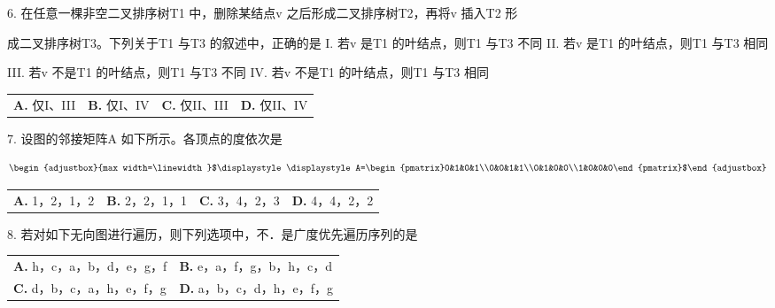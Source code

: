 \documentclass[UTF8,11pt]{ctexart}
\newcommand{\fitmath}[1]{\begin{adjustbox}{max width=\linewidth}$\displaystyle #1$\end{adjustbox}}
\begin{document}
6. 在任意一棵非空二叉排序树T1 中，删除某结点v 之后形成二叉排序树T2，再将v 插入T2 形


成二叉排序树T3。下列关于T1 与T3 的叙述中，正确的是 I. 若v 是T1 的叶结点，则T1 与T3 不同 II. 若v 是T1 的叶结点，则T1 与T3 相同


III. 若v 不是T1 的叶结点，则T1 与T3 不同 IV. 若v 不是T1 的叶结点，则T1 与T3 相同


\begin{center}\begin{tabular}{>{\raggedright\arraybackslash}p{\dimexpr(\linewidth-8\tabcolsep)/4\relax}>{\raggedright\arraybackslash}p{\dimexpr(\linewidth-8\tabcolsep)/4\relax}>{\raggedright\arraybackslash}p{\dimexpr(\linewidth-8\tabcolsep)/4\relax}>{\raggedright\arraybackslash}p{\dimexpr(\linewidth-8\tabcolsep)/4\relax}}
\textbf{A.} 仅I、III & \textbf{B.} 仅I、IV & \textbf{C.} 仅II、III & \textbf{D.} 仅II、IV\\[.35em]\end{tabular}\end{center}

7. 设图的邻接矩阵A 如下所示。各顶点的度依次是


\[\fitmath{\displaystyle A=\begin{pmatrix}0&1&0&1\\0&0&1&1\\0&1&0&0\\1&0&0&0\end{pmatrix}}\]


\begin{center}\begin{tabular}{>{\raggedright\arraybackslash}p{\dimexpr(\linewidth-8\tabcolsep)/4\relax}>{\raggedright\arraybackslash}p{\dimexpr(\linewidth-8\tabcolsep)/4\relax}>{\raggedright\arraybackslash}p{\dimexpr(\linewidth-8\tabcolsep)/4\relax}>{\raggedright\arraybackslash}p{\dimexpr(\linewidth-8\tabcolsep)/4\relax}}
\textbf{A.} 1，2，1，2 & \textbf{B.} 2，2，1，1 & \textbf{C.} 3，4，2，3 & \textbf{D.} 4，4，2，2\\[.35em]\end{tabular}\end{center}

8. 若对如下无向图进行遍历，则下列选项中，不．是广度优先遍历序列的是


\begin{center}\begin{tabular}{>{\raggedright\arraybackslash}p{\dimexpr(\linewidth-4\tabcolsep)/2\relax}>{\raggedright\arraybackslash}p{\dimexpr(\linewidth-4\tabcolsep)/2\relax}}
\textbf{A.} h，c，a，b，d，e，g，f & \textbf{B.} e，a，f，g，b，h，c，d\\[.35em]
\textbf{C.} d，b，c，a，h，e，f，g & \textbf{D.} a，b，c，d，h，e，f，g\\[.35em]\end{tabular}\end{center}
\end{document}
